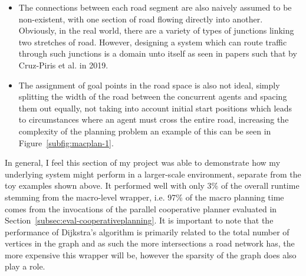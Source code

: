 \begin{itemize}
  \item The connections between each road segment are also naively assumed to be non-existent, with one section of road flowing directly into another. Obviously, in the real world, there are a variety of types of junctions linking two stretches of road. However, designing a system which can route traffic through such junctions is a domain unto itself as seen in papers such that by Cruz-Piris et al.\cite{cruz-pirisAutomatedOptimizationIntersections2019} in 2019.
  \item The assignment of goal points in the road space is also not ideal, simply splitting the width of the road between the concurrent agents and spacing them out equally, not taking into account initial start positions which leads to circumstances where an agent must cross the entire road, increasing the complexity of the planning problem an example of this can be seen in Figure~\ref{subfig:macplan-1}.
\end{itemize}

In general, I feel this section of my project was able to demonstrate how my underlying system might perform in a larger-scale environment, separate from the toy examples shown above. It performed well with only 3\% of the overall runtime stemming from the macro-level wrapper, i.e. 97\% of the macro planning time comes from the invocations of the parallel cooperative planner evaluated in Section~\ref{subsec:eval-cooperativeplanning}. It is important to note that the performance of Dijkstra's algorithm is primarily related to the total number of vertices in the graph and as such the more intersections a road network has, the more expensive this wrapper will be, however the sparsity of the graph does also play a role.

